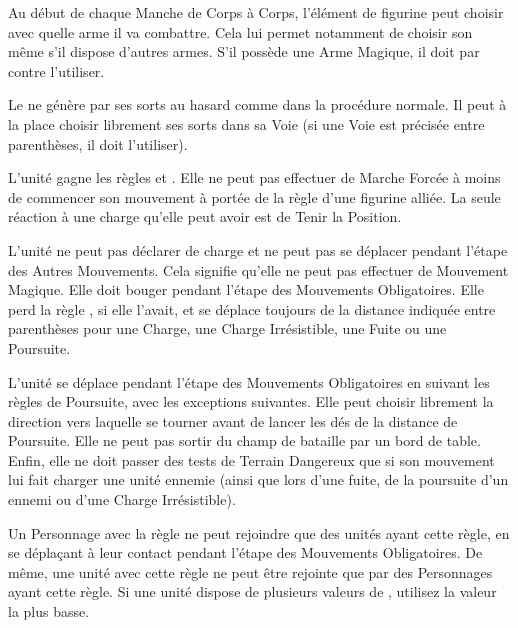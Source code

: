 
Au début de chaque Manche de Corps à Corps, l'élément de figurine peut choisir avec quelle arme il va combattre. Cela lui permet notamment de choisir son \hw{} même s'il dispose d'autres armes. S'il possède une Arme Magique, il doit par contre l'utiliser.


Le \wizard{} ne génère par ses sorts au hasard comme dans la procédure normale. Il peut à la place choisir librement ses sorts dans sa Voie (si une Voie est précisée entre parenthèses, il doit l'utiliser).


L'unité gagne les règles \immunetopsychology{} et \unstable{}. Elle ne peut pas effectuer de Marche Forcée à moins de commencer son mouvement à portée de la règle \inspiringpresence{} d'une figurine alliée. La seule réaction à une charge qu'elle peut avoir est de Tenir la Position.


L'unité ne peut pas déclarer de charge et ne peut pas se déplacer pendant l'étape des Autres Mouvements. Cela signifie qu'elle ne peut pas effectuer de Mouvement Magique. Elle doit bouger pendant l'étape des Mouvements Obligatoires. Elle perd la règle \swiftstride{}, si elle l'avait, et se déplace toujours de la distance indiquée entre parenthèses pour une Charge, une Charge Irrésistible, une Fuite ou une Poursuite.

L'unité se déplace pendant l'étape des Mouvements Obligatoires en suivant les règles de Poursuite, avec les exceptions suivantes. Elle peut choisir librement la direction vers laquelle se tourner avant de lancer les dés de la distance de Poursuite. Elle ne peut pas sortir du champ de bataille par un bord de table. Enfin, elle ne doit passer des tests de Terrain Dangereux que si son mouvement lui fait charger une unité ennemie (ainsi que lors d'une fuite, de la poursuite d'un ennemi ou d'une Charge Irrésistible).

Un Personnage avec la règle \randommovement{} ne peut rejoindre que des unités ayant cette règle, en se déplaçant à leur contact pendant l'étape des Mouvements Obligatoires. De même, une unité avec cette règle ne peut être rejointe que par des Personnages ayant cette règle. Si une unité dispose de plusieurs valeurs de \randommovement{}, utilisez la valeur la plus basse.

